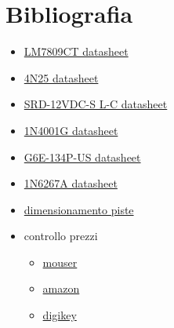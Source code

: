 \documentclass[12pt]{article}
\begin{document}
\section{Bibliografia}
   \label{sec:bibliografia}
   \begin{itemize}
       \item \href{https://datasheetspdf.com/pdf/766811/ThinkiSemiconductor/LM78XX/1}{LM7809CT datasheet}
       \item \href{https://www.alldatasheet.com/datasheet-pdf/pdf/2846/MOTOROLA/4N25.html}{4N25 datasheet}
       \item \href{https://www.alldatasheet.com/datasheet-pdf/pdf/1131947/SONGLERELAY/SRD12VDCSLC.html}{SRD-12VDC-S L-C datasheet}
       \item \href{https://it.farnell.com/on-semiconductor/1n4001g/diodo-standard-1a-do-41/dp/1458986?gclid=CjwKCAjwqcKFBhAhEiwAfEr7zUiXu7byYKAv4I9jzqX1HOrYwDHbs8iKbdpKXM1QnqVZ_xLJMfnMjxoCd9kQAvD_BwE&mckv=s_dc|pcrid|522005845083|kword|1n4001g|match|p|plid||slid||product||pgrid|122762829255|ptaid|kwd-10795764537|&CMP=KNC-GIT-GEN-SKU-MDC-Semiconductors}{1N4001G datasheet}
       \item \href{https://omronfs.omron.com/en_US/ecb/products/pdf/en-g6e.pdf}{G6E-134P-US datasheet}
       \item \href{http://www.farnell.com/datasheets/2240125.pdf}{1N6267A datasheet}
       \item \href{https://www.vincenzov.net/tutorial/stampati/spessorepiste.htm}{dimensionamento piste}
       \item controllo prezzi \begin{itemize}
            \item \href{www.mouser.it}{mouser}
             \item \href{amazon.it}{amazon}
            \item \href{https://www.digikey.com/en/products/detail/omron-electronics-inc-emc-div/G6E-134P-ST-US-DC9/369175}{digikey}
       \end{itemize} 
   \end{itemize}
\end{document}
